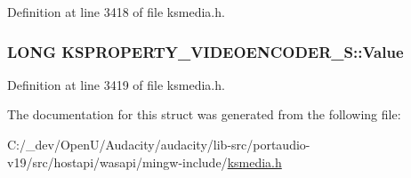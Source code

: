 Definition at line 3418 of file ksmedia.\+h.

\subsubsection[{\texorpdfstring{Value}{Value}}]{\setlength{\rightskip}{0pt plus 5cm}L\+O\+NG K\+S\+P\+R\+O\+P\+E\+R\+T\+Y\+\_\+\+V\+I\+D\+E\+O\+E\+N\+C\+O\+D\+E\+R\+\_\+\+S\+::\+Value}\hypertarget{struct_k_s_p_r_o_p_e_r_t_y___v_i_d_e_o_e_n_c_o_d_e_r___s_aaa1afd83526658c875f44cce28fe7fbc}{}\label{struct_k_s_p_r_o_p_e_r_t_y___v_i_d_e_o_e_n_c_o_d_e_r___s_aaa1afd83526658c875f44cce28fe7fbc}


Definition at line 3419 of file ksmedia.\+h.



The documentation for this struct was generated from the following file\+:\begin{DoxyCompactItemize}
\item 
C\+:/\+\_\+dev/\+Open\+U/\+Audacity/audacity/lib-\/src/portaudio-\/v19/src/hostapi/wasapi/mingw-\/include/\hyperlink{ksmedia_8h}{ksmedia.\+h}\end{DoxyCompactItemize}

